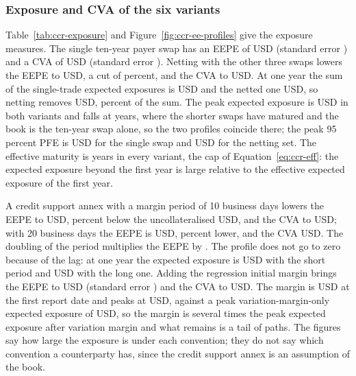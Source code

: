 \subsubsection{Exposure and CVA of the six variants}

Table~\ref{tab:ccr-exposure} and Figure~\ref{fig:ccr-ee-profiles} give the exposure measures. The single ten-year payer swap has an EEPE of \ccrEepeSingle{} USD (standard error \ccrEepeSeSingle) and a CVA of \ccrCvaDSingle{} USD (standard error \ccrCvaSeSingle). Netting with the other three swaps lowers the EEPE to \ccrEepeNetting{} USD, a cut of \ccrNettingCutEepe{} percent, and the CVA to \ccrCvaDNetting{} USD. At one year the sum of the single-trade expected exposures is
\ccrSumSingleOneYear{} USD and the netted one \ccrNettedOneYear{} USD, so netting removes \ccrNettingBenefitOneYear{} USD, \ccrNettingBenefitPct{} percent of the sum. The peak expected exposure is \ccrEePeakNetting{} USD in both variants and falls at \ccrPeakTimeNetting{} years, where the shorter swaps have matured and the book is the ten-year swap alone, so the two profiles coincide there; the
peak 95 percent PFE is \ccrPfePeakSingle{} USD for the single swap and \ccrPfePeakNetting{} USD for the netting set. The effective maturity is \ccrEffMaturity{} years in every variant, the cap of Equation~\ref{eq:ccr-eff}: the expected exposure beyond the first year is large relative to the effective expected exposure of the first year.

A credit support annex with a margin period of 10 business days lowers the EEPE to \ccrEepeCsaShort{} USD, \ccrCutCsaShort{} percent below the uncollateralised \ccrEepeNetting{} USD, and the CVA to \ccrCvaDCsaShort{} USD; with 20 business days the EEPE is \ccrEepeCsaLong{} USD, \ccrCutCsaLong{} percent lower, and the CVA \ccrCvaDCsaLong{} USD. The doubling of the period multiplies the EEPE by \ccrRatioLongShort. The
profile does not go to zero because of the lag: at one year the expected exposure is \ccrEeOneYearCsaShort{} USD with the short period and \ccrEeOneYearCsaLong{} USD with the long one. Adding the regression initial margin brings the EEPE to \ccrEepeIm{} USD (standard error \ccrEepeSeIm) and the CVA to \ccrCvaDIm{} USD. The margin is \ccrDimZero{} USD at the first report date and peaks at \ccrDimPeak{} USD, against
a peak variation-margin-only expected exposure of \ccrEeVmOnlyPeak{} USD, so the margin is several times the peak expected exposure after variation margin and what remains is a tail of paths. The figures say how large the exposure is under each convention; they do not say which convention a counterparty has, since the credit support annex is an assumption of the book.

